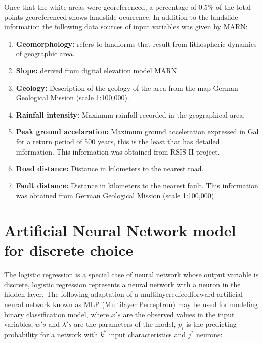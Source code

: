 \documentclass[11pt,twoside]{rmta2010esp}%
\begin{document}
Once that the white areas were georeferenced, a percentage of 0.5\% of the total points georeferenced shows landslide ocurrence. In addition to the landslide information the following data sources of input variables was given by MARN: 
\begin{enumerate}
\item {\bf Geomorphology:} refers to landforms that result from lithospheric dynamics of geographic area.

\item {\bf Slope:} derived from digital elevation model MARN

\item {\bf Geology:} Description of the geology of the area from the map German Geological Mission (scale 1:100,000).

\item {\bf Rainfall intensity:} Maximum rainfall recorded in the geographical area.

\item {\bf Peak ground accelaration:} Maximum ground acceleration expressed in Gal for a return period of 500 years, this is the least that has detailed information. This information was obtained from RSIS II project.

\item {\bf Road distance:} Distance in kilometers to the nearest road. 

\item {\bf Fault distance:} Distance in kilometers to the nearest fault. This information was obtained from German Geological Mission (scale 1:100,000). 
 
\end{enumerate}



\section{Artificial Neural Network model for discrete choice}
The logistic regression is a special case of neural network whose output variable is
discrete, logistic regression represents a neural network with 
a neuron in the hidden layer. The following adaptation of a multilayeredfeedforward artificial neural network known as  
MLP (Multilayer Perceptron) may be used for modeling binary classification model, where $x's$ are the observed values in the input variables, $w's$ and $\lambda's$ are the parameters of the model, $ p_{i} $ is the predicting probability for a network with $ k^{*} $ input characteristics and $ j^{*} $ neurons: 
\end{document}
